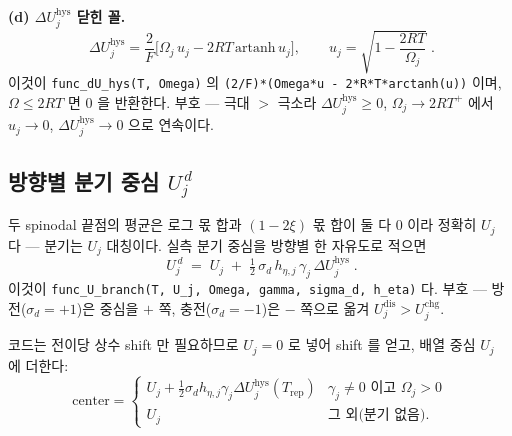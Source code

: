 \documentclass[11pt,a4paper]{article}
\newcommand{\dis}{\mathrm{dis}}
\newcommand{\chg}{\mathrm{chg}}
\newcommand{\hys}{\mathrm{hys}}
\newcommand{\rep}{\mathrm{rep}}
\newcommand{\code}[1]{\texttt{#1}}
\begin{document}
\textbf{(d) $\Delta U_j^\hys$ 닫힌 꼴.}
\begin{equation}
\boxed{\;\Delta U_j^\hys
=\frac{2}{F}\Big[\Omega_j\,u_j-2RT\,\mathrm{artanh}\,u_j\Big],
\qquad u_j=\sqrt{1-\frac{2RT}{\Omega_j}}\;.}
\label{eq:dUhys}
\end{equation}
이것이 \code{func\_dU\_hys(T, Omega)} 의 \code{(2/F)*(Omega*u - 2*R*T*arctanh(u))} 이며,
$\Omega\le2RT$ 면 $0$ 을 반환한다. 부호 — 극대 $>$ 극소라 $\Delta U_j^\hys\ge0$,
$\Omega_j\to2RT^+$ 에서 $u_j\to0$, $\Delta U_j^\hys\to0$ 으로 연속이다.

\subsection{방향별 분기 중심 $U_j^{\,d}$}
두 spinodal 끝점의 평균은 로그 몫 합과 $(1-2\xi)$ 몫 합이 둘 다 $0$ 이라 정확히 $U_j$ 다 —
분기는 $U_j$ 대칭이다. 실측 분기 중심을 방향별 한 자유도로 적으면
\begin{equation}
\boxed{\;U_j^{\,d}\;=\;U_j\;+\;\tfrac12\,\sigma_d\,h_{\eta,j}\,\gamma_j\,\Delta U_j^\hys\;.}
\label{eq:Ubranch}
\end{equation}
이것이 \code{func\_U\_branch(T, U\_j, Omega, gamma, sigma\_d, h\_eta)} 다. 부호 —
방전($\sigma_d=+1$)은 중심을 $+$ 쪽, 충전($\sigma_d=-1$)은 $-$ 쪽으로 옮겨 $U_j^\dis>U_j^\chg$.

코드는 전이당 상수 shift 만 필요하므로 $U_j=0$ 로 넣어 shift 를 얻고, 배열 중심 $U_j$ 에 더한다:
\begin{equation}
\mathrm{center}=
\begin{cases}
U_j+\tfrac12\sigma_d h_{\eta,j}\gamma_j\Delta U_j^\hys(T_\rep) & \gamma_j\ne0 \text{ 이고 } \Omega_j>0\\[2pt]
U_j & \text{그 외(분기 없음)}.
\end{cases}
\label{eq:center}
\end{equation}
\end{document}
